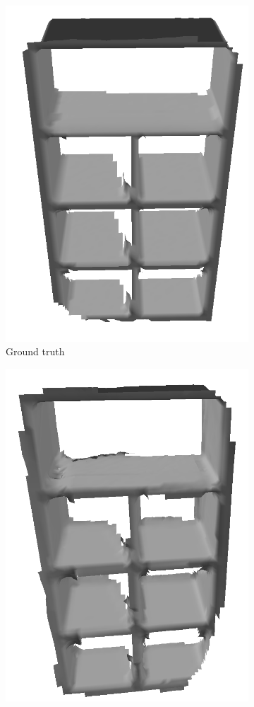 \begin{figure}[ht!]
\centering
\begin{subfigure}{0.4\columnwidth}
	\centering
	\includegraphics[height=1.0\textwidth]{img/arm_slam/groundtruth_sim.png}
	\caption{Ground truth}
\end{subfigure}
\begin{subfigure}{0.4\columnwidth}
	\centering
	\includegraphics[height=1.0\textwidth]{img/arm_slam/artfu_sim.png}

\end{subfigure}
\end{figure}
